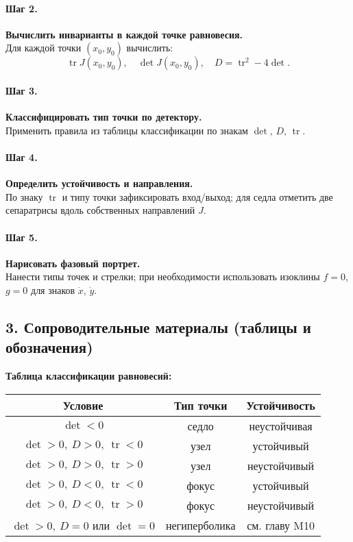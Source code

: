 \paragraph{Шаг 2.} \textbf{Вычислить инварианты в каждой точке равновесия.}\\
Для каждой точки \((x_0,y_0)\) вычислить:
\[
\operatorname{tr}J(x_0,y_0),\quad \det J(x_0,y_0),\quad D=\operatorname{tr}^2-4\det.
\]

\paragraph{Шаг 3.} \textbf{Классифицировать тип точки по детектору.}\\
Применить правила из таблицы классификации по знакам \(\det\), \(D\), \(\operatorname{tr}\).

\paragraph{Шаг 4.} \textbf{Определить устойчивость и направления.}\\
По знаку \(\operatorname{tr}\) и типу точки зафиксировать вход/выход; для седла отметить две сепаратрисы вдоль собственных направлений \(J\).

\paragraph{Шаг 5.} \textbf{Нарисовать фазовый портрет.}\\
Нанести типы точек и стрелки; при необходимости использовать изоклины \(f=0\), \(g=0\) для знаков \(\dot x\), \(\dot y\).

\subsection*{3. Сопроводительные материалы (таблицы и обозначения)}

\textbf{Таблица классификации равновесий:}
\begin{center}
\begin{tabular}{|c|c|c|}
\hline
\textbf{Условие} & \textbf{Тип точки} & \textbf{Устойчивость} \\
\hline
$\det<0$ & седло & неустойчивая \\
\hline
$\det>0,\ D>0,\ \operatorname{tr}<0$ & узел & устойчивый \\
\hline
$\det>0,\ D>0,\ \operatorname{tr}>0$ & узел & неустойчивый \\
\hline
$\det>0,\ D<0,\ \operatorname{tr}<0$ & фокус & устойчивый \\
\hline
$\det>0,\ D<0,\ \operatorname{tr}>0$ & фокус & неустойчивый \\
\hline
$\det>0,\ D=0$ или $\det=0$ & негиперболика & см. главу M10 \\
\hline
\end{tabular}
\end{center}

